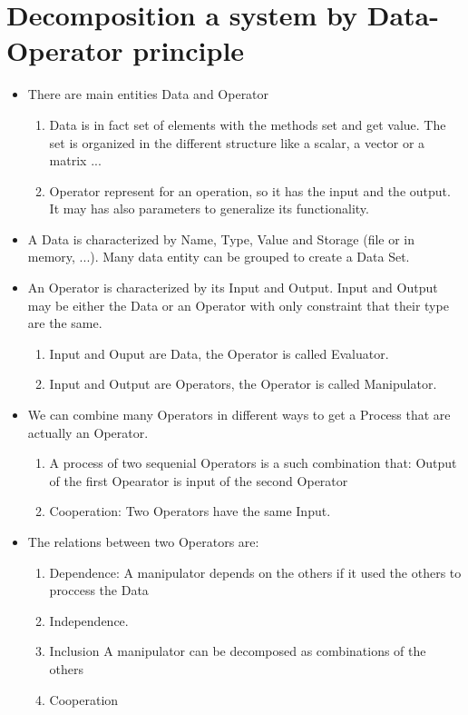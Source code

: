 \documentclass{report}
\begin{document}
\section{Decomposition a system by Data-Operator principle}
\begin{itemize}
\item There are main entities Data and Operator
  \begin{enumerate}
  \item Data is in fact set of elements with the methods set and get value. The 
    set is organized in the different structure like a scalar, a vector or a matrix ...
  \item Operator represent for an operation, so it has  the input and the output.
    It may has also parameters to generalize its functionality.
  \end{enumerate}
\item A Data is characterized by Name, Type, Value and Storage (file or in memory, ...). Many data entity 
  can be grouped to create a Data Set.
\item An Operator is characterized by its Input and Output. Input and Output may be either the Data or an Operator with
  only constraint that their type are the same. 
  \begin{enumerate}
  \item Input and Ouput are Data, the Operator is called Evaluator. 
  \item Input and Output are Operators, the Operator is called Manipulator. 
  \end{enumerate}
\item We can combine many Operators in different ways to get a Process that are actually 
  an Operator.
  \begin{enumerate}
  \item A process of two sequenial Operators is a such combination that: Output of the first Opearator is input 
    of the second Operator
  \item Cooperation: Two Operators have the same Input.
  \end{enumerate}
\item The relations between two Operators are:
  \begin{enumerate}
  \item Dependence: A manipulator depends on the others if it used the others to proccess 
    the Data
  \item Independence.
  \item Inclusion A manipulator can be decomposed as combinations of the others
  \item Cooperation
  \end{enumerate}
\end{itemize}
\end{document}
